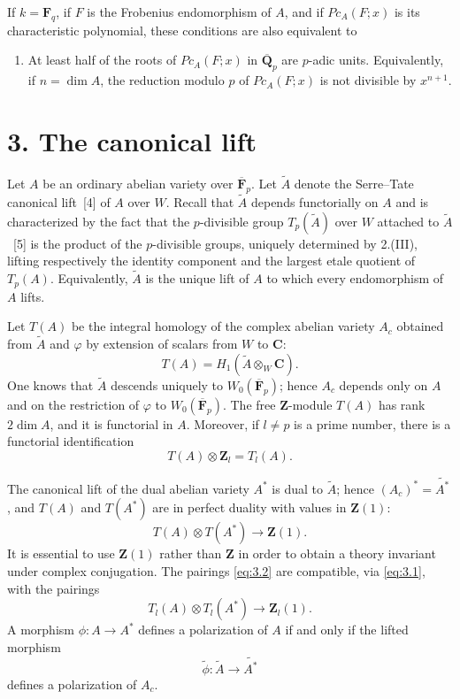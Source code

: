 \documentclass[10pt]{amsart}
\theoremstyle{plain}
\theoremstyle{remark}
\begin{document}
If $k=\mathbf F_q$, if $F$ is the Frobenius endomorphism of $A$, and if $Pc_A(F;x)$ is its characteristic polynomial, these conditions are also equivalent to
\begin{enumerate}
\item[(IV)] At least half of the roots of $Pc_A(F;x)$ in $\overline{\mathbf Q}_p$ are $p$-adic units. Equivalently, if $n=\dim A$, the reduction modulo $p$ of $Pc_A(F;x)$ is not divisible by $x^{n+1}$.
\end{enumerate}

\section*{3. The canonical lift}
Let $A$ be an ordinary abelian variety over $\overline{\mathbf F}_p$. Let $\widetilde A$ denote the Serre--Tate canonical lift~[4] of $A$ over $W$. Recall that $\widetilde A$ depends functorially on $A$ and is characterized by the fact that the $p$-divisible group $T_p(\widetilde A)$ over $W$ attached to $\widetilde A$~[5] is the product of the $p$-divisible groups, uniquely determined by 2.(III), lifting respectively the identity component and the largest etale quotient of $T_p(A)$. Equivalently, $\widetilde A$ is the unique lift of $A$ to which every endomorphism of $A$ lifts.

Let $T(A)$ be the integral homology of the complex abelian variety $A_c$ obtained from $\widetilde A$ and $\varphi$ by extension of scalars from $W$ to $\mathbf C$:
\[
T(A)=H_1(\widetilde A\otimes_W \mathbf C).
\]
One knows that $\widetilde A$ descends uniquely to $W_0(\overline{\mathbf F}_p)$; hence $A_c$ depends only on $A$ and on the restriction of $\varphi$ to $W_0(\overline{\mathbf F}_p)$. The free $\mathbf Z$-module $T(A)$ has rank $2\dim A$, and it is functorial in $A$. Moreover, if $l\neq p$ is a prime number, there is a functorial identification
\begin{equation}\label{eq:3.1}
T(A)\otimes \mathbf Z_l=T_l(A).
\end{equation}

The canonical lift of the dual abelian variety $A^*$ is dual to $\widetilde A$; hence $(A_c)^*=\widetilde{A^*}$, and $T(A)$ and $T(A^*)$ are in perfect duality with values in $\mathbf Z(1)$:
\begin{equation}\label{eq:3.2}
T(A)\otimes T(A^*)\longrightarrow \mathbf Z(1).
\end{equation}
It is essential to use $\mathbf Z(1)$ rather than $\mathbf Z$ in order to obtain a theory invariant under complex conjugation. The pairings \eqref{eq:3.2} are compatible, via \eqref{eq:3.1}, with the pairings
\[
T_l(A)\otimes T_l(A^*)\longrightarrow \mathbf Z_l(1).
\]
A morphism $\phi:A\to A^*$ defines a polarization of $A$ if and only if the lifted morphism
\[
\widetilde\phi:\widetilde A\to \widetilde{A^*}
\]
defines a polarization of $A_c$.
\end{document}
